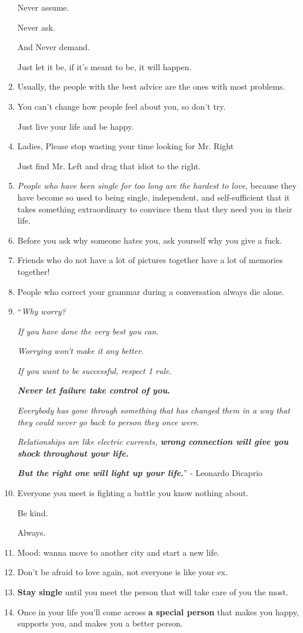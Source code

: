 \documentclass{article}
\begin{document}
\begin{enumerate}
	Never assume.
	
	Never ask.
	
	And Never demand.
	
	Just let it be, if it's meant to be, it will happen.
	\item Usually, the people with the best advice are the ones with most problems.
	\item You can't change how people feel about you, so don't try.
	
	Just live your life and be happy.
	\item Ladies, Please stop wasting your time looking for Mr. Right
	
	Just find Mr. Left and drag that idiot to the right.
	\item \textit{People who have been single for too long are the hardest to love}, because they have become so used to being single, independent, and self-sufficient that it takes something extraordinary to convince them that they need you in their life.
	\item Before you ask why someone hates you, ask yourself why you give a fuck.
	\item Friends who do not have a lot of pictures together have a lot of memories together!
	\item People who correct your grammar during a conversation always die alone.
	\item ``\textit{Why worry?}
	
	\textit{If you have done the very best you can}.
	
	\textit{Worrying won't make it any better}.
	
	\textit{If you want to be successful, respect 1 rule}.
	
	\textbf{\textit{Never let failure take control of you}.}
	
	\textit{Everybody has gone through something that has changed them in a way that they could never go back to person they once were}.
	
	\textit{Relationships are like electric currents, \textbf{wrong connection will give you shock throughout your life.}}
	
	\textbf{\textit{But the right one will light up your life}.}'' - Leonardo Dicaprio
	\item Everyone you meet is fighting a battle you know nothing about.
	
	Be kind.
	
	Always.
	\item Mood: wanna move to another city and start a new life.
	\item Don't be afraid to love again, not everyone is like your ex.
	\item \textbf{Stay single} until you meet the person that will take care of you the most.
	\item Once in your life you'll come across \textbf{a special person} that makes you happy, supports you, and makes you a better person.
	

\end{enumerate}
\end{document}
